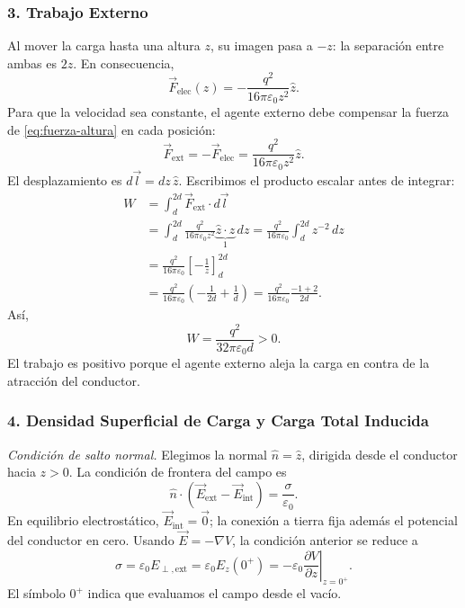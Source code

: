 \documentclass[11pt]{article}
\begin{document}
\subsubsection*{3. Trabajo Externo}
Al mover la carga hasta una altura $z$, su imagen pasa a $-z$: la
separación entre ambas es $2z$. En consecuencia,
\begin{equation}
 \vec{F}_{\mathrm{elec}}(z)
 =-\frac{q^2}{16\pi\varepsilon_0z^2}\hat{z}.
 \label{eq:fuerza-altura}
\end{equation}
Para que la velocidad sea constante, el agente externo debe compensar
la fuerza de \eqref{eq:fuerza-altura} en cada posición:
\[
 \vec{F}_{\mathrm{ext}}=-\vec{F}_{\mathrm{elec}}
 =\frac{q^2}{16\pi\varepsilon_0z^2}\hat{z}.
\]
El desplazamiento es $d\vec{l}=dz\,\hat{z}$. Escribimos el producto
escalar antes de integrar:
\begin{align*}
 W&=\int_d^{2d}\vec{F}_{\mathrm{ext}}\cdot d\vec{l}\\
 &=\int_d^{2d}\frac{q^2}{16\pi\varepsilon_0z^2}
    \underbrace{\hat{z}\cdot\hat{z}}_{1}\,dz
 =\frac{q^2}{16\pi\varepsilon_0}\int_d^{2d}z^{-2}\,dz\\
 &=\frac{q^2}{16\pi\varepsilon_0}
    \left[-\frac1z\right]_d^{2d}\\
 &=\frac{q^2}{16\pi\varepsilon_0}
    \left(-\frac{1}{2d}+\frac1d\right)
 =\frac{q^2}{16\pi\varepsilon_0}\frac{-1+2}{2d}.
\end{align*}
Así,
\begin{equation}
 \boxed{W=\frac{q^2}{32\pi\varepsilon_0d}>0.}
 \label{eq:plano-trabajo}
\end{equation}
El trabajo es positivo porque el agente externo aleja la carga en
contra de la atracción del conductor.

\subsubsection*{4. Densidad Superficial de Carga y Carga Total Inducida}
\textit{Condición de salto normal.} Elegimos la normal
$\hat{n}=\hat{z}$, dirigida desde el conductor hacia $z>0$. La condición
de frontera del campo es
\begin{equation}
 \hat{n}\cdot(\vec{E}_{\mathrm{ext}}-\vec{E}_{\mathrm{int}})
 =\frac{\sigma}{\varepsilon_0}.
 \label{eq:salto-normal}
\end{equation}
En equilibrio electrostático, $\vec{E}_{\mathrm{int}}=\vec{0}$; la
conexión a tierra fija además el potencial del conductor en cero.
Usando $\vec{E}=-\nabla V$, la condición anterior se reduce a
\[
 \sigma=\varepsilon_0 E_{\perp,\mathrm{ext}}
 =\varepsilon_0 E_z(0^+)
 =-\varepsilon_0\left.\frac{\partial V}{\partial z}\right|_{z=0^+}.
\]
El símbolo $0^+$ indica que evaluamos el campo desde el vacío.
\end{document}
